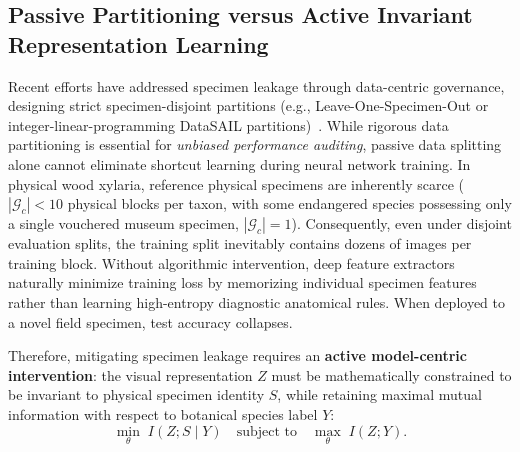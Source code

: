 \documentclass[a4paper,fleqn]{cas-sc}
\begin{document}
\subsection{Passive Partitioning versus Active Invariant Representation Learning}
Recent efforts have addressed specimen leakage through data-centric governance, designing strict specimen-disjoint partitions (e.g., Leave-One-Specimen-Out or integer-linear-programming DataSAIL partitions)~\cite{joeres2025}. While rigorous data partitioning is essential for \emph{unbiased performance auditing}, passive data splitting alone cannot eliminate shortcut learning during neural network training. In physical wood xylaria, reference physical specimens are inherently scarce ($|\mathcal{G}_c| < 10$ physical blocks per taxon, with some endangered species possessing only a single vouchered museum specimen, $|\mathcal{G}_c| = 1$). Consequently, even under disjoint evaluation splits, the training split inevitably contains dozens of images per training block. Without algorithmic intervention, deep feature extractors naturally minimize training loss by memorizing individual specimen features rather than learning high-entropy diagnostic anatomical rules. When deployed to a novel field specimen, test accuracy collapses.

Therefore, mitigating specimen leakage requires an \textbf{active model-centric intervention}: the visual representation $Z$ must be mathematically constrained to be invariant to physical specimen identity $S$, while retaining maximal mutual information with respect to botanical species label $Y$:
\begin{equation}
    \min_\theta \; I(Z; S \mid Y) \quad \text{subject to} \quad \max_\theta \; I(Z; Y).
    \label{eq:ideal_objective}
\end{equation}
\end{document}
